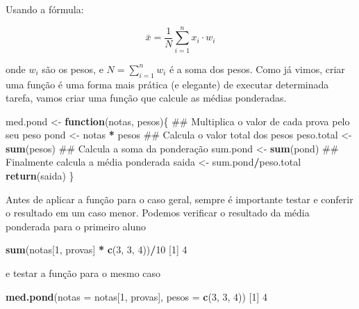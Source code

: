 \documentclass[10pt,a4paper]{book}
\newenvironment{Shaded}{\begin{snugshade}}{\end{snugshade}}
\newcommand{\KeywordTok}[1]{\textcolor[rgb]{0.13,0.29,0.53}{\textbf{#1}}}
\newcommand{\DataTypeTok}[1]{\textcolor[rgb]{0.13,0.29,0.53}{#1}}
\newcommand{\DecValTok}[1]{\textcolor[rgb]{0.00,0.00,0.81}{#1}}
\newcommand{\StringTok}[1]{\textcolor[rgb]{0.31,0.60,0.02}{#1}}
\newcommand{\ControlFlowTok}[1]{\textcolor[rgb]{0.13,0.29,0.53}{\textbf{#1}}}
\newcommand{\OperatorTok}[1]{\textcolor[rgb]{0.81,0.36,0.00}{\textbf{#1}}}
\newcommand{\NormalTok}[1]{#1}
\begin{document}
Usando a fórmula:

\[
\bar{x} = \frac{1}{N} \sum_{i=1}^{n} x_i \cdot w_i
\]

onde \(w_i\) são os pesos, e \(N = \sum_{i=1}^{n} w_i\) é a soma dos
pesos. Como já vimos, criar uma função é uma forma mais prática (e
elegante) de executar determinada tarefa, vamos criar uma função que
calcule as médias ponderadas.

\begin{Shaded}
\begin{Highlighting}[]
\NormalTok{med.pond <-}\StringTok{ }\ControlFlowTok{function}\NormalTok{(notas, pesos)\{}
\NormalTok{    ## Multiplica o valor de cada prova pelo seu peso}
\NormalTok{    pond <-}\StringTok{ }\NormalTok{notas }\OperatorTok{*}\StringTok{ }\NormalTok{pesos}
\NormalTok{    ## Calcula o valor total dos pesos}
\NormalTok{    peso.total <-}\StringTok{ }\KeywordTok{sum}\NormalTok{(pesos)}
\NormalTok{    ## Calcula a soma da ponderação}
\NormalTok{    sum.pond <-}\StringTok{ }\KeywordTok{sum}\NormalTok{(pond)}
\NormalTok{    ## Finalmente calcula a média ponderada}
\NormalTok{    saida <-}\StringTok{ }\NormalTok{sum.pond}\OperatorTok{/}\NormalTok{peso.total}
    \KeywordTok{return}\NormalTok{(saida)}
\NormalTok{\}}
\end{Highlighting}
\end{Shaded}

Antes de aplicar a função para o caso geral, sempre é importante testar
e conferir o resultado em um caso menor. Podemos verificar o resultado
da média ponderada para o primeiro aluno

\begin{Shaded}
\begin{Highlighting}[]
\KeywordTok{sum}\NormalTok{(notas[}\DecValTok{1}\NormalTok{, provas] }\OperatorTok{*}\StringTok{ }\KeywordTok{c}\NormalTok{(}\DecValTok{3}\NormalTok{, }\DecValTok{3}\NormalTok{, }\DecValTok{4}\NormalTok{))}\OperatorTok{/}\DecValTok{10}
\NormalTok{[}\DecValTok{1}\NormalTok{] }\DecValTok{4}
\end{Highlighting}
\end{Shaded}

e testar a função para o mesmo caso

\begin{Shaded}
\begin{Highlighting}[]
\KeywordTok{med.pond}\NormalTok{(}\DataTypeTok{notas =}\NormalTok{ notas[}\DecValTok{1}\NormalTok{, provas], }\DataTypeTok{pesos =} \KeywordTok{c}\NormalTok{(}\DecValTok{3}\NormalTok{, }\DecValTok{3}\NormalTok{, }\DecValTok{4}\NormalTok{))}
\NormalTok{[}\DecValTok{1}\NormalTok{] }\DecValTok{4}
\end{Highlighting}
\end{Shaded}
\end{document}
